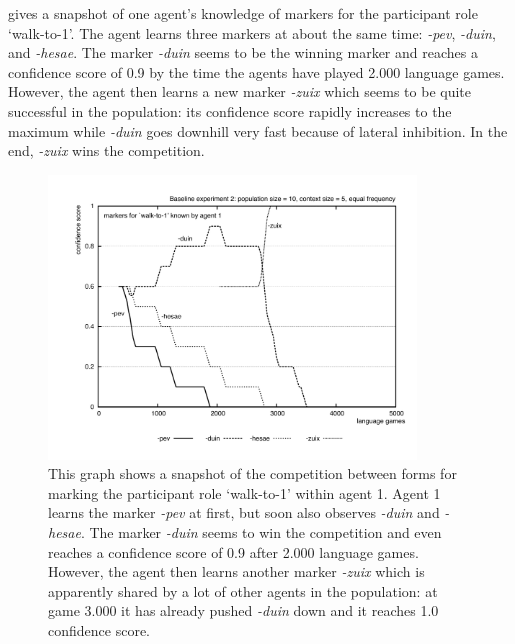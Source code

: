 \largerpage 
{} gives a snapshot of one agent's knowledge of markers for the participant role `walk-to-1'. The agent learns three markers at about the same time: {\em -pev}, {\em -duin}, and {\em -hesae}. The marker {\em -duin} seems to be the winning marker and reaches a confidence score of 0.9 by the time the agents have played 2.000 language games. However, the agent then learns a new marker {\em -zuix} which seems to be quite successful in the population: its confidence score rapidly increases to the maximum while {\em -duin} goes downhill very fast because of lateral inhibition. In the end, {\em -zuix} wins the competition. 




\clearpage

\begin{figure}[t]
\centerline{\includegraphics[width=0.87\textwidth]{Chapter3/figs/graph-base2-comp}}
  \caption[Baseline experiment 2: snapshot of competition (equal frequency)]{This graph shows a snapshot of the competition between forms for marking the participant role `walk-to-1' within agent 1. Agent 1 learns the marker {\em -pev} at first, but soon also observes {\em -duin} and {\em -hesae}. The marker {\em -duin} seems to win the competition and even reaches a confidence score of 0.9 after 2.000 language games. However, the agent then learns another marker {\em -zuix} which is apparently shared by a lot of other agents in the population: at game 3.000 it has already pushed {\em -duin} down and it reaches 1.0 confidence score.}
   \label{f:base2-comp}
\end{figure}



